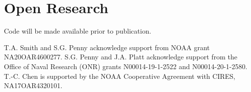 \documentclass[draft]{agujournal2019}
\begin{document}
%
%








\appendix




\newpage
\section{Open Research}
Code will be made available prior to publication.
%
%


\acknowledgments

T.A. Smith and S.G. Penny acknowledge support from NOAA grant NA20OAR4600277.
S.G. Penny and J.A. Platt acknowledge support from the Office of Naval Research
(ONR) grants N00014-19-1-2522 and N00014-20-1-2580. T.-C. Chen is supported by
the NOAA Cooperative Agreement with CIRES, NA17OAR4320101.



%

\end{document}
